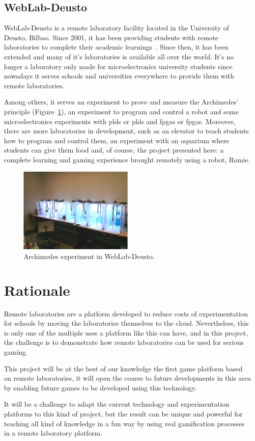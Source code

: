 \subsection{WebLab-Deusto}

WebLab-Deusto is a remote laboratory facility located in the University of Deusto, Bilbao. Since
2001, it has been providing students with remote laboratories to complete their academic
learnings~\cite{weblab}. Since then, it has been extended and many of it's laboratories is available
all over the world. It's no longer a laboratory only made for microelectronics university students
since nowadays it serves schools and universities everywhere to provide them with remote
laboratories.

Among others, it serves an experiment to prove and measure the Archimedes' principle
(Figure~\ref{fig:archimedes}), an experiment to program and control a robot and some
microelectronics experiments with \acrlong{pld}s or \acrshort{pld}s and \acrlong{fpga}s or
\acrshort{fpga}s. Moreover, there are more laboratories in development, such as an elevator to teach
students how to program and control them, an experiment with an aquarium where students can give
them food and, of course, the project presented here: a complete learning and gaming experience
brought remotely using a robot, Romie.

\begin{figure}[!htbp]
	\centering
	\includegraphics[width=0.5\textwidth]{fig/archimedes}
	\caption{Archimedes experiment in WebLab-Deusto.}\label{fig:archimedes}
\end{figure}

\section{Rationale}

Remote laboratories are a platform developed to reduce costs of experimentation for schools by
moving the laboratories themselves to the cloud. Nevertheless, this is only one of the multiple uses
a platform like this can have, and in this project, the challenge is to demonstrate how remote
laboratories can be used for serious gaming.

This project will be at the best of our knowledge the first game platform based on remote
laboratories, it will open the course to future developments in this area by enabling future games
to be developed using this technology.

It will be a challenge to adapt the current technology and experimentation platforms to this kind of
project, but the result can be unique and powerful for teaching all kind of knowledge in a fun way
by using real gamification processes in a remote laboratory platform.

